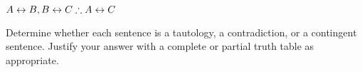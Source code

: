 \begin{compactlist}
\item $A\eiff B, B\eiff C \therefore A\eiff C$ %
\end{compactlist}

\problempart
\label{pr.TT.TTorC3}
Determine whether each sentence is a tautology, a contradiction, or a contingent sentence. Justify your answer with a complete or partial truth table as appropriate.


